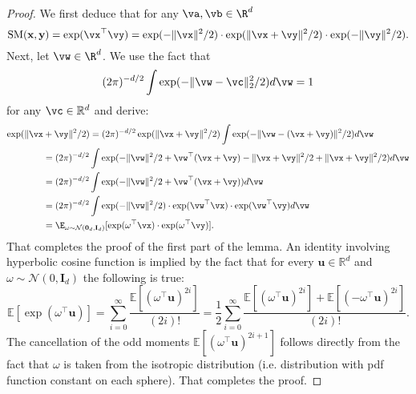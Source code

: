 \begin{proof}
We first deduce that for any $\va, \vb \in \R^d$
\begin{equation*}
\mathrm{SM}(\mathbf{x},\mathbf{y})=
    \exp (\vx^\top \vy) = \exp (- \| \vx \|^2 / 2) \cdot \exp (\| \vx + \vy \|^2 / 2) \cdot \exp (- \| \vy \|^2 / 2) .
\end{equation*}
Next, let $\vw \in \R^d$. We use the fact that
\begin{equation*}
    (2 \pi)^{-d/2} \int \exp (- \| \vw - \vc \|_2^2 / 2) d \vw = 1
\end{equation*}
for any $\vc \in \mathbb{R}^d$ and derive:
\begin{align*}
    \exp (\| \vx &+ \vy \|^2 / 2) = (2 \pi)^{- d / 2} \exp (\| \vx + \vy \|^2 / 2) \int  \exp (- \| \vw - (\vx + \vy) \|^2 / 2) d \vw \\
    &= (2 \pi)^{- d / 2} \int  \exp (- \| \vw \|^2 / 2 + \vw^\top (\vx + \vy) - \| \vx + \vy \|^2 / 2 + \| \vx + \vy \|^2 / 2) d \vw \\
    &= (2 \pi)^{- d / 2} \int  \exp (- \| \vw \|^2 / 2 + \vw^\top (\vx + \vy) ) d \vw \\
    &= (2 \pi)^{- d / 2} \int  \exp (- \| \vw \|^2 / 2 ) \cdot \exp (\vw^\top \vx) \cdot \exp (\vw^\top \vy) d \vw \\
    &= \E_{\omega \sim \mathcal{N} (\mathbf{0}_d, \mathbf{I}_{d})} [\exp (\omega^\top \vx) \cdot \exp (\omega^\top \vy)] .
\end{align*}
That completes the proof of the first part of the lemma. An identity involving hyperbolic cosine function is implied by the fact that for every $\mathbf{u} \in \mathbb{R}^{d}$ and $\omega \sim \mathcal{N}(0, \mathbf{I}_{d})$ the following is true:
\begin{equation}
\mathbb{E}[\exp(\omega^{\top}\mathbf{u})] = \sum_{i=0}^{\infty} \frac{\mathbb{E}[(\omega^{\top}\mathbf{u})^{2i}]}{(2i)!} = 
\frac{1}{2} \sum_{i=0}^{\infty}
\frac{\mathbb{E}[(\omega^{\top}\mathbf{u})^{2i}] + \mathbb{E}[(-\omega^{\top}\mathbf{u})^{2i}]}{(2i)!}.
\end{equation}
The cancellation of the odd moments $\mathbb{E}[(\omega^{\top}\mathbf{u})^{2i+1}]$ follows directly from the fact that $\omega$ is taken from the isotropic distribution (i.e. distribution with pdf function constant on each sphere).
That completes the proof.
\end{proof}


